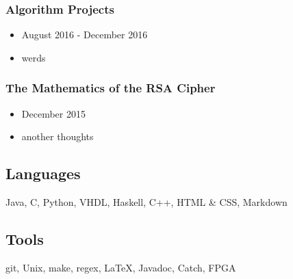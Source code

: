 \documentclass[18pt]{article}
\providecommand{\tightlist}{
    \setlength{\itemsep}{0pt}\setlength{\parskip}{0pt}
}
\begin{document}
\begin{multicols}{2}
      \subsubsection*{Algorithm Projects}
        \begin{itemize}\tightlist
          \item August 2016 - December 2016
          \item werds
        \end{itemize}
        
      
      \subsubsection*{The Mathematics of the RSA Cipher}
      \begin{itemize}\tightlist
        \item December 2015
        \item another thoughts
      \end{itemize}

    \vfill
    \columnbreak
    
        
    \subsection*{Languages}\label{languages}
        Java,
        C,
        Python,
        VHDL,
        Haskell,
        C++,
        HTML \& CSS,
        Markdown
    
    \subsection*{Tools}\label{tools}
        git,
        Unix,
        make,
        regex,
        \LaTeX,
        Javadoc,
        Catch,
        FPGA
    

\end{multicols}
\end{document}
